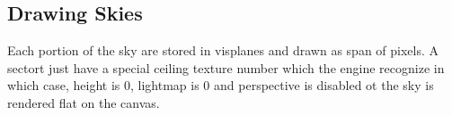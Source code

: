 \subsection{Drawing Skies}
Each portion of the sky are stored in visplanes and drawn as span of pixels. A sectort just have a special ceiling texture number which the engine recognize in which case, height is 0, lightmap is 0 and perspective is disabled ot the sky is rendered flat on the canvas.






























